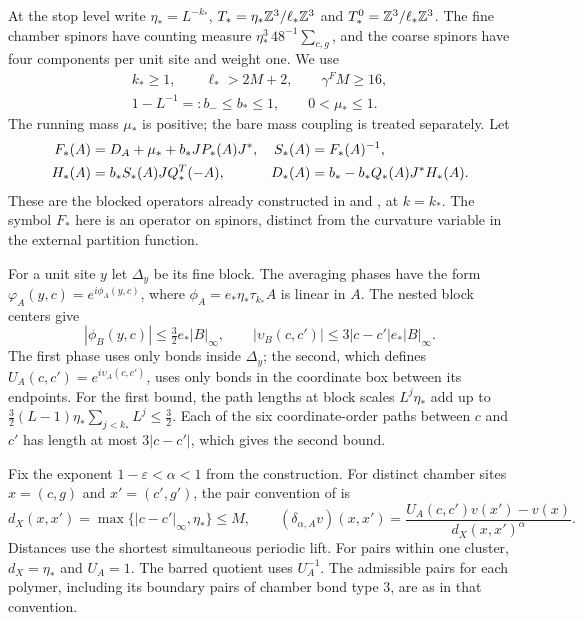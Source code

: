 At the stop level write $\eta_*=L^{-k_*}$,
$T_*=\eta_*\mathbb Z^3/\ell_*\mathbb Z^3$ and
$T_*^0=\mathbb Z^3/\ell_*\mathbb Z^3$. The fine chamber spinors
have counting measure $\eta_*^3\,48^{-1}\sum_{c,g}$,
and the coarse spinors have four components per unit
site and weight one. We use
\[
 \begin{gathered}
 k_*\ge1,\qquad \ell_*>2M+2,\qquad \gamma^FM\ge16,\\
 1-L^{-1}=:b_-\le b_*\le1,\qquad
 0<\mu_*\le1.
 \end{gathered}
\]
The running mass $\mu_*$ is positive; the bare mass
coupling is treated separately. Let
\begin{align}
 F_*(A)&=D_A+\mu_*+b_*JP_*(A)J^*,&
 S_*(A)&=F_*(A)^{-1},\notag\\
 H_*(A)&=b_*S_*(A)JQ_*^T(-A),&
 D_*(A)&=b_*-b_*Q_*(A)J^*H_*(A).
                                  \label{eq:interacting-terminal-operators}
\end{align}
These are the blocked operators already constructed
in \cite[(51)]{FermionBlock} and
\cite[(52)]{FermionBlock}, at $k=k_*$.
The symbol $F_*$ here is an operator on spinors,
distinct from the curvature variable in the external
partition function.

For a unit site $y$ let $\Delta_y$ be its fine block.
The averaging phases have the form
$\varphi_A(y,c)=e^{i\phi_A(y,c)}$, where
$\phi_A=e_*\eta_*\tau_{k_*}A$ is linear in $A$.
The nested block centers give
\begin{equation}\label{eq:interacting-phase-bounds}
 |\phi_B(y,c)|\le\tfrac32e_*|B|_\infty,\qquad
 |\upsilon_B(c,c')|\le3|c-c'|e_*|B|_\infty.
\end{equation}
The first phase uses only bonds inside $\Delta_y$;
the second, which defines $U_A(c,c')=e^{i\upsilon_A(c,c')}$,
uses only bonds in the coordinate box between its endpoints.
For the first bound, the path lengths at block scales
$L^j\eta_*$ add up to
$\frac32(L-1)\eta_*\sum_{j<k_*}L^j\le\frac32$.
Each of the six coordinate-order paths between
$c$ and $c'$ has length at most $3|c-c'|$,
which gives the second bound.

Fix the exponent $1-\varepsilon<\alpha<1$ from the construction.
For distinct chamber sites $x=(c,g)$ and $x'=(c',g')$, the
pair convention of \cite[\S2.2]{NormalizedContraction} is
\[
 d_X(x,x')=\max\{|c-c'|_\infty,\eta_*\}\le M,\qquad
 (\delta_{\alpha,A}v)(x,x')
   =\frac{U_A(c,c')v(x')-v(x)}{d_X(x,x')^\alpha}.
\]
Distances use the shortest simultaneous periodic lift.
For pairs within one cluster, $d_X=\eta_*$ and $U_A=1$.
The barred quotient uses $U_A^{-1}$.
The admissible pairs for each polymer, including its boundary
pairs of chamber bond type $3$, are as in that convention.

